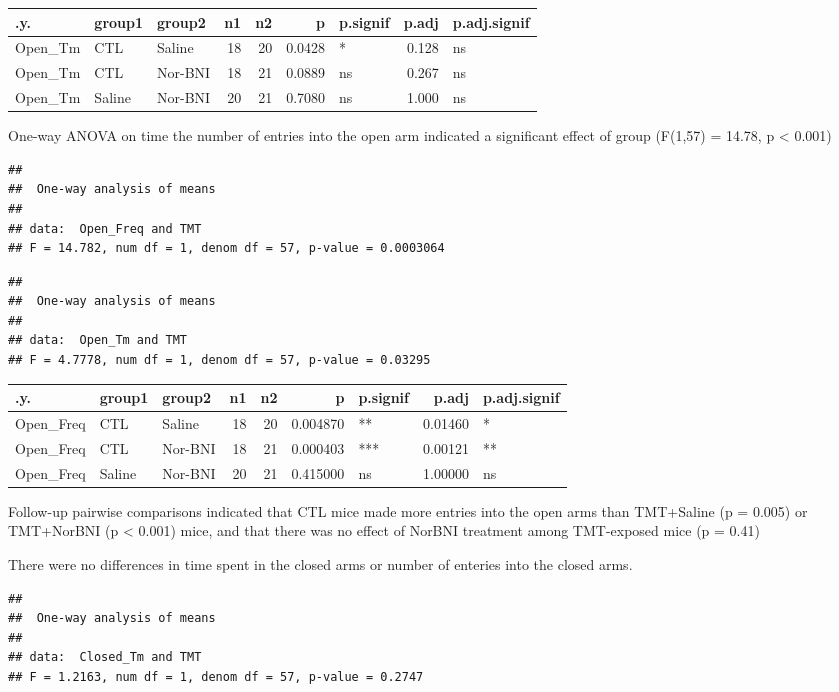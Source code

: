 \documentclass[
]{book}
\begin{document}
\begin{tabular}{l|l|l|r|r|r|l|r|l}
\hline
.y. & group1 & group2 & n1 & n2 & p & p.signif & p.adj & p.adj.signif\\
\hline
Open\_Tm & CTL & Saline & 18 & 20 & 0.0428 & * & 0.128 & ns\\
\hline
Open\_Tm & CTL & Nor-BNI & 18 & 21 & 0.0889 & ns & 0.267 & ns\\
\hline
Open\_Tm & Saline & Nor-BNI & 20 & 21 & 0.7080 & ns & 1.000 & ns\\
\hline
\end{tabular}

One-way ANOVA on time the number of entries into the open arm indicated a significant effect of group (F(1,57) = 14.78, p \textless{} 0.001)

\begin{verbatim}
## 
##  One-way analysis of means
## 
## data:  Open_Freq and TMT
## F = 14.782, num df = 1, denom df = 57, p-value = 0.0003064
\end{verbatim}

\begin{verbatim}
## 
##  One-way analysis of means
## 
## data:  Open_Tm and TMT
## F = 4.7778, num df = 1, denom df = 57, p-value = 0.03295
\end{verbatim}

\begin{tabular}{l|l|l|r|r|r|l|r|l}
\hline
.y. & group1 & group2 & n1 & n2 & p & p.signif & p.adj & p.adj.signif\\
\hline
Open\_Freq & CTL & Saline & 18 & 20 & 0.004870 & ** & 0.01460 & *\\
\hline
Open\_Freq & CTL & Nor-BNI & 18 & 21 & 0.000403 & *** & 0.00121 & **\\
\hline
Open\_Freq & Saline & Nor-BNI & 20 & 21 & 0.415000 & ns & 1.00000 & ns\\
\hline
\end{tabular}

Follow-up pairwise comparisons indicated that CTL mice made more entries into the open arms than TMT+Saline (p = 0.005) or TMT+NorBNI (p \textless{} 0.001) mice, and that there was no effect of NorBNI treatment among TMT-exposed mice (p = 0.41)

There were no differences in time spent in the closed arms or number of enteries into the closed arms.

\begin{verbatim}
## 
##  One-way analysis of means
## 
## data:  Closed_Tm and TMT
## F = 1.2163, num df = 1, denom df = 57, p-value = 0.2747
\end{verbatim}
\end{document}
